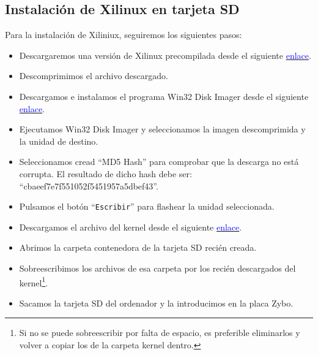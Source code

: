 \documentclass[12pt,letterpaper]{article}
\begin{document}
\subsection{Instalación de Xilinux en tarjeta SD}
Para la instalación de Xiliniux, seguiremos los siguientes pasos:
\begin{itemize}
	\item Descargaremos una versión de Xilinux precompilada desde el siguiente \href{https://www.dropbox.com/s/9qgcoyjzoi764f0/2016.02.02.debian-cbaeef7e7f551052f5451957a5dbef43.zip?dl=0}{\textcolor{blue}{enlace}}.
	\item Descomprimimos el archivo descargado.
	\item Descargamos e instalamos el programa Win32 Disk Imager desde el siguiente \href{https://dw.uptodown.com/dwn/w76tVn7onjw1uZFTLSx7oG5vt1Y7gsfE_vPZCAa88I4YqL5Lp6S__CQhpJZGOLPYdjr73a4yGULPiRxv8Z2IsSRQjRPewPceg1Ol2gDzH3IkO3MHOCcuKQCNZwYI9Pvt/8_NYEhYYhGoJ_QXK-PQtvMDn5aHkqiWxwMofLuT2S5SxxDw2zu6f1OMCW0kqLnB0PGf-zrvou_F_nzjB4fn6Nuvp3WZcVrkFzGgNrhVLInDUMHPM0Jfxh76lJU_IATF7/9xrSlUN8npqZOVysN4LIc5iQnXIPmWNSWKNBLv7hcuQxXmyjX8qERxO48SnXIgr83mVVF-bcUsWJGGryhVqZ_LiBsoZmxxEyZE5JXoqVhCI=/}{\textcolor{blue}{enlace}}.
	\item Ejecutamos Win32 Disk Imager y seleccionamos la imagen descomprimida y la unidad de destino.
	\item Seleccionamos cread ``MD5 Hash'' para comprobar que la descarga no está corrupta. El resultado de dicho hash debe ser: ``cbaeef7e7f551052f5451957a5dbef43''.
	\item Pulsamos el botón ``\texttt{Escribir}'' para flashear la unidad seleccionada.
	\item Descargamos el archivo del kernel desde el siguiente \href{https://uc405c43ce82f6c3032b21ba76bf.dl.dropboxusercontent.com/cd/0/get/AehqJhpiTxZ90sAdGxOFqHxr04BAsug_4RaV6MPX5yBDOQBVaIpDw11X6LdVBi7DPsndN7IxeWYRcEmUAt4xnKoIeYJBRtYu4JtZ_M71as8xbw/file?_download_id=621489597300519201006251662619095482850364296264714456845096204891&_notify_domain=www.dropbox.com&dl=1}{\textcolor{blue}{enlace}}.
	\item Abrimos la carpeta contenedora de la tarjeta SD recién creada.
	\item Sobreescribimos los archivos de esa carpeta por los recién descargados del kernel\footnote{Si no se puede sobreescribir por falta de espacio, es preferible eliminarlos y volver a copiar los de la carpeta kernel dentro.}.
	\item Sacamos la tarjeta SD del ordenador y la introducimos en la placa Zybo.
\end{itemize}
\end{document}
